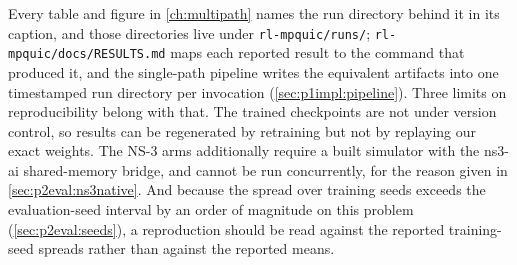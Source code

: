 
Every table and figure in \cref{ch:multipath} names the run directory behind it in its caption, and
those directories live under \texttt{rl-mpquic/runs/}; \texttt{rl-mpquic/docs/RESULTS.md} maps each
reported result to the command that produced it, and the single-path pipeline writes the equivalent
artifacts into one timestamped run directory per invocation (\cref{sec:p1impl:pipeline}). Three limits
on reproducibility belong with that. The trained checkpoints are not under version control, so results
can be regenerated by retraining but not by replaying our exact weights. The NS-3 arms additionally
require a built simulator with the ns3-ai shared-memory bridge, and cannot be run concurrently, for the
reason given in \cref{sec:p2eval:ns3native}. And because the spread over training seeds exceeds the
evaluation-seed interval by an order of magnitude on this problem (\cref{sec:p2eval:seeds}), a
reproduction should be read against the reported training-seed spreads rather than against the reported
means.
